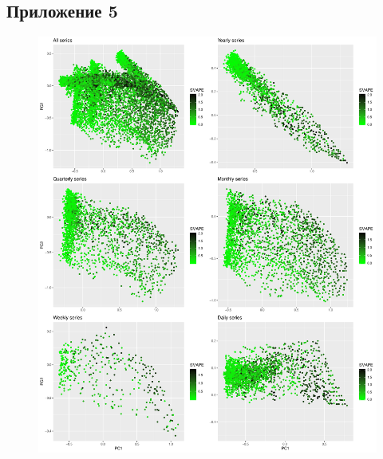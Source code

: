 \documentclass[a4paper,12pt]{article}
\begin{document}
\newpage
\subsection{Приложение 5}



\label{min_smape}
\begin{figure}[!h]
	
	\begin{center}
		\includegraphics[width=
		\textwidth]{smape}%
	\end{center}
	
	
\end{figure} 
\end{document}
